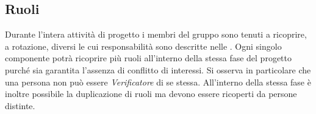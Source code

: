 \subsection{Ruoli}
Durante l'intera attività di progetto i membri del gruppo \GroupName{} sono tenuti a ricoprire, a rotazione, diversi  le cui responsabilità sono descritte nelle \NormeDiProgetto{}. Ogni singolo componente potrà ricoprire più ruoli all'interno della stessa fase del progetto purché sia garantita l'assenza di conflitto di interessi. Si osserva in particolare che una persona non può essere \textit{Verificatore} di se stessa. All'interno della stessa fase è inoltre possibile la duplicazione di ruoli ma devono essere ricoperti da persone distinte. 


